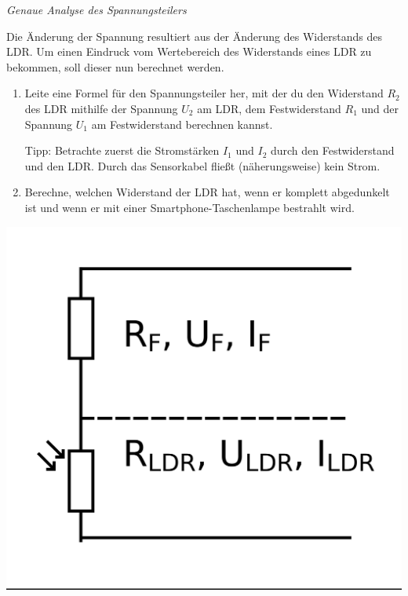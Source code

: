 \begin{aufgabe} \emph{Genaue Analyse des Spannungsteilers}
	
	Die Änderung der Spannung resultiert aus der Änderung des Widerstands des LDR. Um einen Eindruck vom Wertebereich des Widerstands eines LDR zu bekommen, soll dieser nun berechnet werden.\medskip
	
	\begin{minipage}{0.78\textwidth}
		\begin{enumerate}[label=\alph*), itemsep=0ex, parsep=0mm]
			\item Leite eine Formel für den Spannungsteiler her, mit der du den Widerstand $R_2$ des LDR mithilfe der Spannung $U_2$ am LDR, dem Festwiderstand $R_1$ und der Spannung $U_1$ am Festwiderstand berechnen kannst.
			
			Tipp: Betrachte zuerst die Stromstärken $I_1$ und $I_2$ durch den Festwiderstand und den LDR. Durch das Sensorkabel fließt (näherungsweise) kein Strom.
			\item Berechne, welchen Widerstand der LDR hat, wenn er komplett abgedunkelt ist und wenn er mit einer Smartphone-Taschenlampe bestrahlt wird.
		\end{enumerate}
	\end{minipage}
	\hfill
	\begin{minipage}{0.2\textwidth}
		\centering
		\includegraphics[width=\textwidth]{./Zeichnungen/spannungsteiler-ldr.png}
	\end{minipage}
\end{aufgabe}

